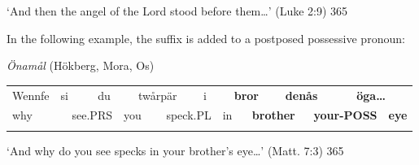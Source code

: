 \begin{styleTranslation}
‘And then the angel of the Lord stood before them…’ (Luke 2:9) 365

\end{styleTranslation}

\begin{styleBodytextC}
In the following example, the suffix is added to a postposed possessive pronoun:

\end{styleBodytextC}

\begin{listWWNumileveli}
\item {}

\begin{styleExample}
\textit{Önamål} (Hökberg, Mora, Os)

\end{styleExample}

\end{listWWNumileveli}

\begin{tabular}{llllllllllllllll}
\lsptoprule
Wennfe & \multicolumn{2}{l}{si

} & \multicolumn{2}{l}{du

} & \multicolumn{2}{l}{twårpär

} & \multicolumn{2}{l}{i

} & \multicolumn{2}{l}{{\bfseries bror}

} & \multicolumn{2}{l}{{\bfseries denås}

} & \multicolumn{2}{l}{{\bfseries öga…}

} & \\
\multicolumn{2}{l}{why

} & \multicolumn{2}{l}{see.PRS

} & \multicolumn{2}{l}{you

} & \multicolumn{2}{l}{speck.PL

} & \multicolumn{2}{l}{in

} & \multicolumn{2}{l}{{\bfseries brother}

} & \multicolumn{2}{l}{{\bfseries your-POSS}

} & \multicolumn{2}{l}{{\bfseries eye}

}\\
\lspbottomrule
\end{tabular}

\begin{styleTranslation}
‘And why do you see specks in your brother’s eye…’ (Matt. 7:3) 365

\end{styleTranslation}

